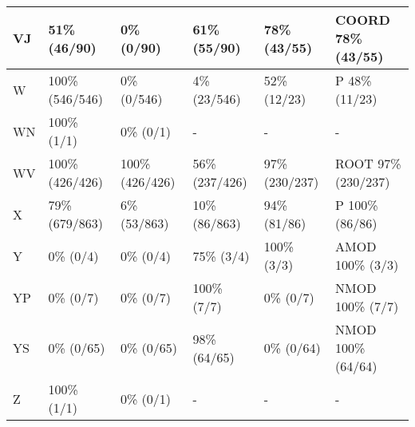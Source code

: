 \begin{figure*}
\begin{tabular}{|l|l|l|l|l|l|}
\hline
VJ & 51\% (46/90) & 0\% (0/90) & 61\% (55/90) & 78\% (43/55) & COORD 78\% (43/55) \\ 
\hline
W & 100\% (546/546) & 0\% (0/546) & 4\% (23/546) & 52\% (12/23) & P 48\% (11/23) \\ 
\hline
WN & 100\% (1/1) & 0\% (0/1) & - & - & - \\ 
\hline
WV & 100\% (426/426) & 100\% (426/426) & 56\% (237/426) & 97\% (230/237) & ROOT 97\% (230/237) \\ 
\hline
X & 79\% (679/863) & 6\% (53/863) & 10\% (86/863) & 94\% (81/86) & P 100\% (86/86) \\ 
\hline
Y & 0\% (0/4) & 0\% (0/4) & 75\% (3/4) & 100\% (3/3) & AMOD 100\% (3/3) \\ 
\hline
YP & 0\% (0/7) & 0\% (0/7) & 100\% (7/7) & 0\% (0/7) & NMOD 100\% (7/7) \\ 
\hline
YS & 0\% (0/65) & 0\% (0/65) & 98\% (64/65) & 0\% (0/64) & NMOD 100\% (64/64) \\ 
\hline
Z & 100\% (1/1) & 0\% (0/1) & - & - & - \\ 
\hline
\end{tabular}
\end{figure*}
